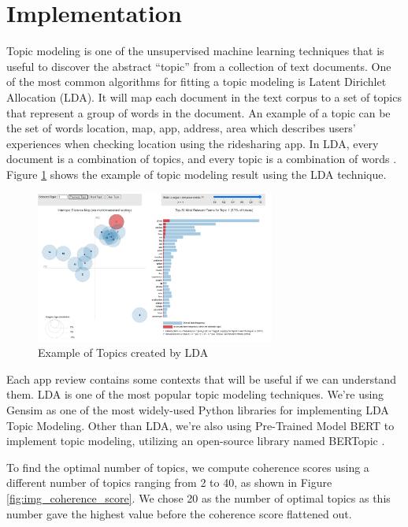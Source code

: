 \documentclass[12pt]{article}
\begin{document}
\section{Implementation}
Topic modeling is one of the unsupervised machine learning techniques that is useful to discover the abstract “topic” from a collection of text documents. One of the most common algorithms for fitting a topic modeling is Latent Dirichlet Allocation (LDA). It will map each document in the text corpus to a set of topics that represent a group of words in the document. An example of a topic can be the set of words {location, map, app, address, area} which describes users’ experiences when checking location using the ridesharing app. In LDA, every document is a combination of topics, and every topic is a combination of words \cite{text_mining_R}. Figure \ref{fig:img_lda_topic_modeling_example} shows the example of topic modeling result using the LDA technique.


\begin{figure}[h]
\begin{center}
\includegraphics[width=0.7\textwidth]{figures/image9.png}
\caption{Example of Topics created by LDA}
\label{fig:img_lda_topic_modeling_example}
\end{center}
\end{figure}

Each app review contains some contexts that will be useful if we can understand them. LDA is one of the most popular topic modeling techniques. We’re using Gensim as one of the most widely-used Python libraries for implementing LDA Topic Modeling. Other than LDA, we’re also using Pre-Trained Model BERT to implement topic modeling, utilizing an open-source library named BERTopic \cite{bertopic}.

To find the optimal number of topics, we compute coherence scores using a different number of topics ranging from 2 to 40, as shown in Figure \ref{fig:img_coherence_score}. We chose 20 as the number of optimal topics as this number gave the highest value before the coherence score flattened out.
\end{document}
